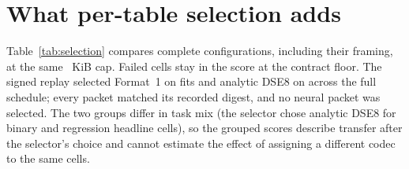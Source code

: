 \documentclass[10pt,letterpaper,twocolumn]{article}
\newcommand{\cli}[1]{{\ttfamily\fontsize{8.9}{11}\selectfont #1}}
\begin{document}
\begin{table}[t]
\end{table}

\section{What per-table selection adds}\label{app:selection}
Table~\ref{tab:selection} compares complete configurations, including their framing, at the same ~KiB cap. Failed cells stay in the score at the contract floor. The signed replay selected Format~1 on  fits and analytic \cli{DSE8} on  across the full schedule; every packet matched its recorded digest, and no neural packet was selected. The two groups differ in task mix (the selector chose analytic \cli{DSE8} for  binary and  regression headline cells), so the grouped scores describe transfer after the selector's choice and cannot estimate the effect of assigning a different codec to the same cells.
\end{document}
